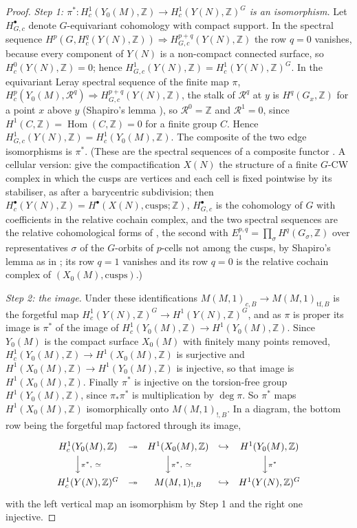 \documentclass[11pt]{amsart}
\theoremstyle{definition}
\newcommand{\Z}{\mathbb{Z}}
\begin{document}
\begin{proof}
\emph{Step 1: $\pi^*\colon H^1_c(Y_0(M),\Z)\to H^1_c(Y(N),\Z)^G$ is an isomorphism.} Let $H^\bullet_{G,c}$ denote $G$-equivariant cohomology with compact support. In the spectral sequence $H^p(G,H^q_c(Y(N),\Z))\Rightarrow H^{p+q}_{G,c}(Y(N),\Z)$ the row $q=0$ vanishes, because every component of $Y(N)$ is a non-compact connected surface, so $H^0_c(Y(N),\Z)=0$; hence $H^1_{G,c}(Y(N),\Z)=H^1_c(Y(N),\Z)^G$. In the equivariant Leray spectral sequence of the finite map $\pi$, $H^p_c(Y_0(M),\mathcal R^q)\Rightarrow H^{p+q}_{G,c}(Y(N),\Z)$, the stalk of $\mathcal R^q$ at $y$ is $H^q(G_x,\Z)$ for a point $x$ above $y$ (Shapiro's lemma \cite[III.(6.2)]{Brown}), so $\mathcal R^0=\Z$ and $\mathcal R^1=0$, since $H^1(C,\Z)=\operatorname{Hom}(C,\Z)=0$ for a finite group $C$. Hence $H^1_{G,c}(Y(N),\Z)=H^1_c(Y_0(M),\Z)$. The composite of the two edge isomorphisms is $\pi^*$. (These are the spectral sequences of a composite functor \cite[Chapter V]{Grothendieck57}. A cellular version: give the compactification $X(N)$ the structure of a finite $G$-CW complex in which the cusps are vertices and each cell is fixed pointwise by its stabiliser, as after a barycentric subdivision; then $H^\bullet_c(Y(N),\Z)=H^\bullet(X(N),\text{cusps};\Z)$, $H^\bullet_{G,c}$ is the cohomology of $G$ with coefficients in the relative cochain complex, and the two spectral sequences are the relative cohomological forms of \cite[VII.(7.2) and (7.7)]{Brown}, the second with $E_1^{p,q}=\prod_\sigma H^q(G_\sigma,\Z)$ over representatives $\sigma$ of the $G$-orbits of $p$-cells not among the cusps, by Shapiro's lemma as in \cite[VII.(7.6)]{Brown}; its row $q=1$ vanishes and its row $q=0$ is the relative cochain complex of $(X_0(M),\text{cusps})$.)

\emph{Step 2: the image.} Under these identifications $M(M,1)_{c,B}\to M(M,1)_{\mathrm{tf},B}$ is the forgetful map $H^1_c(Y(N),\Z)^G\to H^1(Y(N),\Z)^G$, and as $\pi$ is proper its image is $\pi^*$ of the image of $H^1_c(Y_0(M),\Z)\to H^1(Y_0(M),\Z)$. Since $Y_0(M)$ is the compact surface $X_0(M)$ with finitely many points removed, $H^1_c(Y_0(M),\Z)\to H^1(X_0(M),\Z)$ is surjective and $H^1(X_0(M),\Z)\to H^1(Y_0(M),\Z)$ is injective, so that image is $H^1(X_0(M),\Z)$. Finally $\pi^*$ is injective on the torsion-free group $H^1(Y_0(M),\Z)$, since $\pi_*\pi^*$ is multiplication by $\deg\pi$. So $\pi^*$ maps $H^1(X_0(M),\Z)$ isomorphically onto $M(M,1)_{!,B}$. In a diagram, the bottom row being the forgetful map factored through its image,
\[
\def\arraystretch{1.5}
\begin{array}{ccccc}
H^1_c(Y_0(M),\Z)&\twoheadrightarrow&H^1(X_0(M),\Z)&\hookrightarrow&H^1(Y_0(M),\Z)\\
\Big\downarrow{\scriptstyle\pi^*,\ \simeq}&&\Big\downarrow{\scriptstyle\pi^*,\ \simeq}&&\Big\downarrow{\scriptstyle\pi^*}\\
H^1_c(Y(N),\Z)^G&\twoheadrightarrow&M(M,1)_{!,B}&\hookrightarrow&H^1(Y(N),\Z)^G
\end{array}
\]
with the left vertical map an isomorphism by Step 1 and the right one injective.


\end{proof}
\end{document}
